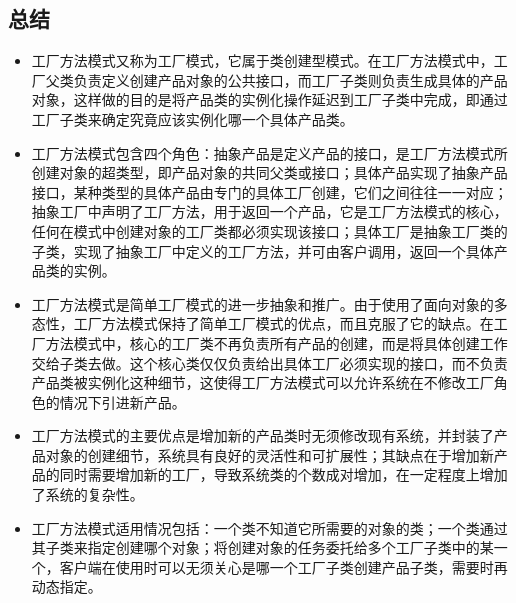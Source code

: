 \documentclass[letterpaper,10pt,english]{sphinxmanual}
\begin{document}
\subsection{总结}
\label{\detokenize{creational_patterns/factory_method:id14}}\begin{itemize}
\item {} 
\sphinxAtStartPar
工厂方法模式又称为工厂模式，它属于类创建型模式。在工厂方法模式中，工厂父类负责定义创建产品对象的公共接口，而工厂子类则负责生成具体的产品对象，这样做的目的是将产品类的实例化操作延迟到工厂子类中完成，即通过工厂子类来确定究竟应该实例化哪一个具体产品类。

\item {} 
\sphinxAtStartPar
工厂方法模式包含四个角色：抽象产品是定义产品的接口，是工厂方法模式所创建对象的超类型，即产品对象的共同父类或接口；具体产品实现了抽象产品接口，某种类型的具体产品由专门的具体工厂创建，它们之间往往一一对应；抽象工厂中声明了工厂方法，用于返回一个产品，它是工厂方法模式的核心，任何在模式中创建对象的工厂类都必须实现该接口；具体工厂是抽象工厂类的子类，实现了抽象工厂中定义的工厂方法，并可由客户调用，返回一个具体产品类的实例。

\item {} 
\sphinxAtStartPar
工厂方法模式是简单工厂模式的进一步抽象和推广。由于使用了面向对象的多态性，工厂方法模式保持了简单工厂模式的优点，而且克服了它的缺点。在工厂方法模式中，核心的工厂类不再负责所有产品的创建，而是将具体创建工作交给子类去做。这个核心类仅仅负责给出具体工厂必须实现的接口，而不负责产品类被实例化这种细节，这使得工厂方法模式可以允许系统在不修改工厂角色的情况下引进新产品。

\item {} 
\sphinxAtStartPar
工厂方法模式的主要优点是增加新的产品类时无须修改现有系统，并封装了产品对象的创建细节，系统具有良好的灵活性和可扩展性；其缺点在于增加新产品的同时需要增加新的工厂，导致系统类的个数成对增加，在一定程度上增加了系统的复杂性。

\item {} 
\sphinxAtStartPar
工厂方法模式适用情况包括：一个类不知道它所需要的对象的类；一个类通过其子类来指定创建哪个对象；将创建对象的任务委托给多个工厂子类中的某一个，客户端在使用时可以无须关心是哪一个工厂子类创建产品子类，需要时再动态指定。

\end{itemize}

\sphinxstepscope
\end{document}
